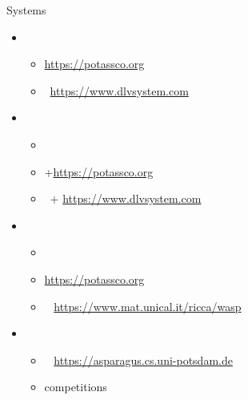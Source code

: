 \begin{frame}{Systems}
  \begin{itemize}
  \item {}
    \begin{itemize}
    \item \alert{\clingo} \cite{gekakasc17a}\hfill \url{https://potassco.org}
    \item \dlv\           \cite{dlv03a,alcadofuleperiveza17a}\hfill \url{https://www.dlvsystem.com}
    \end{itemize}
  \item {}
    \begin{itemize}
    \item \lparse\        \cite{syrjanen01a}                                                     %
    \item \alert{\gringo} \cite{gescth07a,gekaosscth09a}+\cite{gekakosc11a,cafageiakakrlemarisc19a}\hfill\url{https://potassco.org}
    \item \idlv\          \cite{cafupeza17a}+\cite{cafageiakakrlemarisc19a}                        \hfill\url{https://www.dlvsystem.com}
    \end{itemize}
  \item {}
    \begin{itemize}
    \item \smodels\       \cite{niesim96a,siniso02a}              %
    \item \alert{\clasp}  \cite{gekanesc07a,gekasc09c}              \hfill \url{https://potassco.org}
    \item \wasp\          \cite{aldofaleri13a}                      \hfill \url{https://www.mat.unical.it/ricca/wasp}
    \end{itemize}
  \item {}
    \begin{itemize}
    \item \asparagus\     \cite{boansctr04a}                        \hfill \url{https://asparagus.cs.uni-potsdam.de}
    \item competitions \cite{contest07a,contest09a,contest11a,contest13a,cagemari14a}
    \end{itemize}
  \end{itemize}
\end{frame}
%
